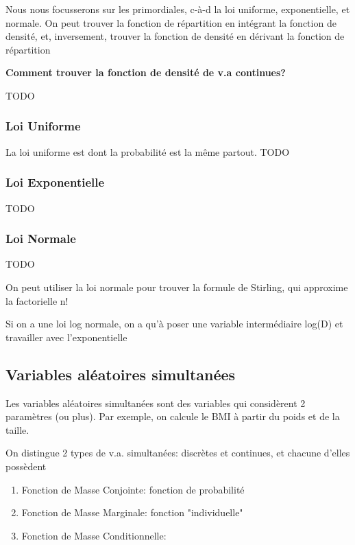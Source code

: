 \documentclass{article}
\begin{document}
Nous nous focusserons sur les primordiales, c-à-d la loi uniforme,
exponentielle, et normale. On peut trouver la fonction de répartition en
intégrant la fonction de densité, et, inversement, trouver la fonction
de densité en dérivant la fonction de répartition

\textbf{Comment trouver la fonction de densité de v.a continues?}

TODO

\subsubsection{Loi Uniforme}%
\label{ssub:Loi Uniforme}

La loi uniforme est dont la probabilité est la même partout.
TODO

\subsubsection{Loi Exponentielle}%
\label{ssub:Loi Exponentielle}

TODO

\subsubsection{Loi Normale}%
\label{ssub:Loi Normale}

TODO

\begin{remark}
    On peut utiliser la loi normale pour trouver la formule de Stirling,
    qui approxime la factorielle n!
\end{remark}

\begin{remark}
    Si on a une loi log normale, on a qu'à poser une variable intermédiaire
    log(D) et travailler avec l'exponentielle
\end{remark}

\subsection{Variables aléatoires simultanées}

Les variables aléatoires simultanées sont des variables qui considèrent
2 paramètres (ou plus). Par exemple, on calcule le BMI à partir du poids
et de la taille.

On distingue 2 types de v.a. simultanées: discrètes et continues, et
chacune d'elles possèdent
\begin{enumerate}
    \item Fonction de Masse Conjointe: fonction de probabilité
    \item Fonction de Masse Marginale: fonction "individuelle"
    \item Fonction de Masse Conditionnelle:
\end{enumerate}
\end{document}
